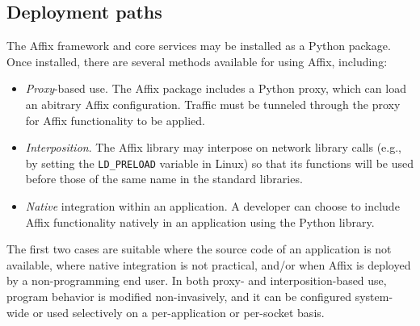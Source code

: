 \subsection{Deployment paths}
\label{subsec-deployment}





The Affix framework and core services may be installed as a 
Python package. Once installed, 
there are several methods available for using 
Affix, including:
\begin{itemize}
    \item \emph{Proxy}-based use. The Affix package includes a Python proxy,
which can load an abitrary Affix configuration. 
Traffic must be tunneled through the 
proxy for Affix functionality to be applied.
    \item \emph{Interposition}. The Affix library may interpose on network library calls 
(e.g., by setting the \texttt{LD\_PRELOAD} variable in Linux) so that 
its functions will be used before those of the same name in the standard libraries. 
    \item \emph{Native} integration within an application. A developer can 
choose to include Affix functionality natively in an application using the Python 
library.
\end{itemize}
The first two cases are suitable where the source code of an application 
is not available, where native integration is not practical, and/or when 
Affix is deployed by a non-programming end user.
In both proxy- and interposition-based use, 
program behavior is modified non-invasively, and it can be configured system-wide 
or used selectively on a per-application or per-socket basis.



